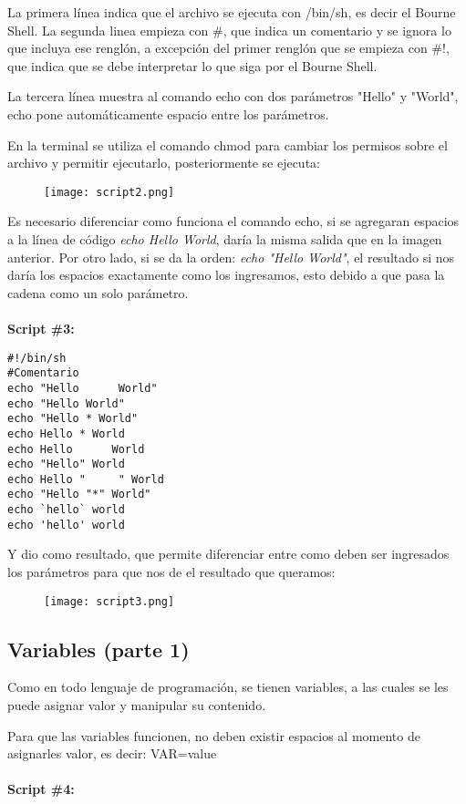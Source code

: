 \documentclass[a4paper]{article}
\begin{document}
La primera línea indica que el archivo se ejecuta con /bin/sh, es decir el Bourne Shell. La segunda linea empieza con \#, que indica un comentario y se ignora lo que incluya ese renglón, a excepción del primer renglón que se empieza con \#!, que indica que se debe interpretar lo que siga por el Bourne Shell.

La tercera línea muestra al comando echo con dos parámetros "Hello" y "World", echo pone automáticamente espacio entre los parámetros.

En la terminal se utiliza el comando chmod para cambiar los permisos sobre el archivo y permitir ejecutarlo, posteriormente se ejecuta: 
\begin{figure}[h!]
  \texttt{[image: script2.png]}
  \centering
  \label{fig:13}
\end{figure}

Es necesario diferenciar como funciona el comando echo, si se agregaran espacios a la línea de código \textit{echo Hello    World}, daría la misma salida que en la imagen anterior. Por otro lado, si se da la orden: \textit{echo "Hello    World"}, el resultado si nos daría los espacios exactamente como los ingresamos, esto debido a que pasa la cadena como un solo parámetro. \\
\\
\textbf{Script \#3:}
\begin{verbatim}
#!/bin/sh
#Comentario
echo "Hello      World"
echo "Hello World"
echo "Hello * World"
echo Hello * World
echo Hello      World
echo "Hello" World
echo Hello "     " World
echo "Hello "*" World"
echo `hello` world
echo 'hello' world
\end{verbatim}

Y dio como resultado, que permite diferenciar entre como deben ser ingresados los parámetros para que nos de el resultado que queramos: 
\begin{figure}[h!]
  \texttt{[image: script3.png]}
  \centering
  \label{fig:14}
\end{figure}

\subsection{Variables (parte 1)}

Como en todo lenguaje de programación, se tienen variables, a las cuales se les puede asignar valor y manipular su contenido. 

Para que las variables funcionen, no deben existir espacios al momento de asignarles valor, es decir: VAR=value\\
\\
\textbf{Script \#4:}
\end{document}
